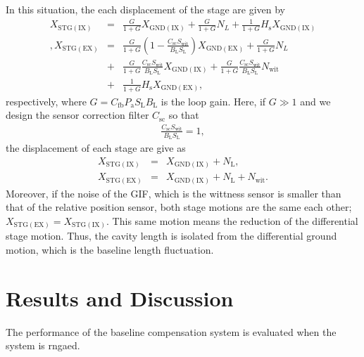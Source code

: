 In this situation, the each displacement of the stage are given by 
\begin{eqnarray}
  X_{\mathrm{STG(IX)}} &=& \displaystyle\frac{G}{1+G} X_{\mathrm{GND(IX)}} + \frac{G}{1+G} N_{L} + \frac{1}{1+G} H_{\mathrm{s}} X_{\mathrm{GND(IX)}} \\ \nonumber,
  X_{\mathrm{STG(EX)}} &=& \displaystyle\frac{G}{1+G} \left(1- \frac{C_{\mathrm{sc}}S_{\mathrm{wit}}}{B_{\mathrm{L}}S_{\mathrm{L}}}\right) X_{\mathrm{GND(EX)}} + \frac{G}{1+G}N_{L} \\ \nonumber
  &+& \frac{G}{1+G} \frac{C_{\mathrm{sc}}S_{\mathrm{wit}}} {B_{\mathrm{L}}S_{\mathrm{L}}} X_{\mathrm{GND(IX)}}
  + \frac{G}{1+G} \frac{C_{\mathrm{sc}}S_{\mathrm{wit}}} {B_{\mathrm{L}}S_{\mathrm{L}}} N_{\mathrm{wit}}\\ 
  &+& \frac{1}{1+G} H_{\mathrm{s}} X_{\mathrm{GND(EX)}},
\end{eqnarray}
respectively, where $G=C_{\mathrm{fb}}P_{\mathrm{a}}S_{\mathrm{L}}B_{\mathrm{L}}$ is the loop gain. Here, if $G\gg1$ and we design the sensor correction filter $C_{\mathrm{sc}}$ so that
\begin{eqnarray}
  \frac{C_{\mathrm{sc}}S_{\mathrm{wit}}}{B_{\mathrm{L}}S_{\mathrm{L}}} = 1,
\end{eqnarray}
the displacement of each stage are give as 
\begin{eqnarray}
  X_{\mathrm{STG(IX)}} &=& X_{\mathrm{GND(IX)}} + N_{\mathrm{L}},\\
  X_{\mathrm{STG(EX)}} &=& X_{\mathrm{GND(IX)}} + N_{\mathrm{L}} + N_{\mathrm{wit}}.
\end{eqnarray}
Moreover, if the noise of the GIF, which is the wittness sensor is smaller than that of the relative position sensor, both stage motions are the same each other; $X_{\mathrm{STG(EX)}}=X_{\mathrm{STG(IX)}}$. This same motion means the reduction of the differential stage motion. Thus, the cavity length is isolated from the differential ground motion, which is the baseline length fluctuation.




\section{Results and Discussion } \label{sec:sec52}
The performance of the baseline compensation system is evaluated when the system is rngaed.

